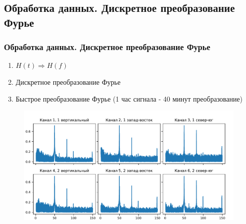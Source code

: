 \documentclass[10pt,pdf,hyperref={unicode}, dvipsnames]{beamer}
\newcommand\frametitless[1]{\subsection{#1}\frametitle{#1}}
\begin{document}
\begin{frame}[t]
	\frametitless{Обработка данных. Дискретное преобразование Фурье}
	\vspace{-0.5em}

	\begin{enumerate}
		\item $H(t) \Rightarrow H(f)$
		\item Дискретное преобразование Фурье
		\item Быстрое преобразование Фурье (1 час сигнала - 40 минут преобразование)
	\end{enumerate}
	\vspace{-0.8em}
	\begin{figure}[h]
		\centering
		\includegraphics[width=1\textwidth]{images/6g.pdf}
	\end{figure}	


\end{frame}
\end{document}
